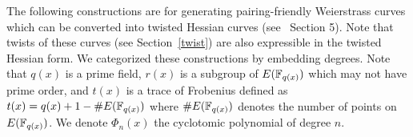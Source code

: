 The following constructions are for generating pairing-friendly Weierstrass curves
which can be converted into twisted Hessian curves (see~\cite{2015/hessian} Section 5).
Note that twists of these curves (see Section~\ref{twist}) are also expressible in the twisted Hessian form.
We categorized these constructions by embedding degrees.
Note that $q(x)$ is a prime field,
$r(x)$ is a subgroup of $E(\mathbb{F}_{q(x)})$ which may not have prime order,
and $t(x)$ is a trace of Frobenius defined as $t(x) = q(x) + 1 - \#E(\mathbb{F}_{q(x)})$
where $\#E(\mathbb{F}_{q(x)})$ denotes the number of points on $E(\mathbb{F}_{q(x)})$.
We denote $\Phi_{n}(x)$ the cyclotomic polynomial of degree $n$.



